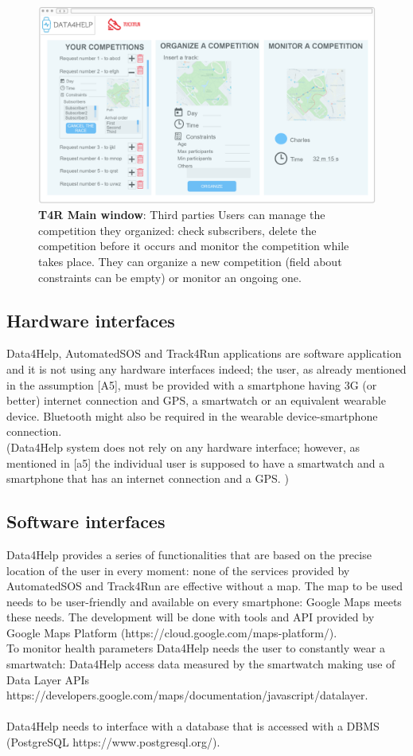 \begin{figure}[H]
\centering
\includegraphics[scale = 0.5]{Mocks/Desktop_T4R_Main.PNG}
\caption{\textbf{T4R Main window}: Third parties Users can manage the competition they organized: check subscribers, delete the competition before it occurs and monitor the competition while takes place. They can organize a new competition (field about constraints can be empty) or monitor an ongoing one. }
\end{figure}

\subsection{Hardware interfaces}
Data4Help, AutomatedSOS and Track4Run applications are software application and it is not using any hardware interfaces indeed; the user, as already mentioned in the assumption [A5], must be provided with a smartphone having 3G (or better) internet connection and GPS, a smartwatch or an equivalent wearable device. Bluetooth might also be required in the wearable device-smartphone connection.  \\
(Data4Help system does not rely on any hardware interface; however, as mentioned in [a5] the individual user is supposed to have a smartwatch and a smartphone that has an internet connection and a GPS.  )
\subsection{Software interfaces}
Data4Help provides a series of functionalities that are based on the precise location of the user in every moment: none of the services provided by AutomatedSOS and Track4Run are effective without a map. The map to be used needs to be user-friendly and available on every smartphone: Google Maps meets these needs. The development will be done with tools and API provided by Google Maps Platform (https://cloud.google.com/maps-platform/).  \\
To monitor health parameters Data4Help needs the user to constantly wear a smartwatch:
Data4Help access data measured by the smartwatch making use of Data Layer APIs \\ https://developers.google.com/maps/documentation/javascript/datalayer.\\
\\
Data4Help needs to interface with a database that is accessed with a DBMS (PostgreSQL
 https://www.postgresql.org/). 


